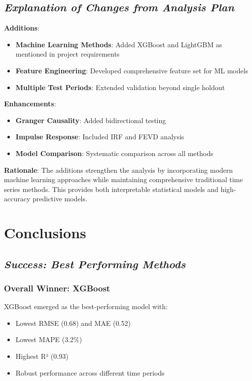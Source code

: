 \documentclass[12pt]{article}
\begin{document}
\subsection*{\textit{Explanation of Changes from Analysis Plan}}

\textbf{Additions}:
\begin{itemize}
    \item \textbf{Machine Learning Methods}: Added XGBoost and LightGBM as mentioned in project requirements
    \item \textbf{Feature Engineering}: Developed comprehensive feature set for ML models
    \item \textbf{Multiple Test Periods}: Extended validation beyond single holdout
\end{itemize}

\textbf{Enhancements}:
\begin{itemize}
    \item \textbf{Granger Causality}: Added bidirectional testing
    \item \textbf{Impulse Response}: Included IRF and FEVD analysis
    \item \textbf{Model Comparison}: Systematic comparison across all methods
\end{itemize}

\textbf{Rationale}:
The additions strengthen the analysis by incorporating modern machine learning approaches while maintaining comprehensive traditional time series methods. This provides both interpretable statistical models and high-accuracy predictive models.


\section*{\textbf{Conclusions}}

\subsection*{\textit{Success: Best Performing Methods}}

\subsubsection*{Overall Winner: XGBoost}

XGBoost emerged as the best-performing model with:
\begin{itemize}
    \item Lowest RMSE (0.68) and MAE (0.52)
    \item Lowest MAPE (3.2\%)
    \item Highest R² (0.93)
    \item Robust performance across different time periods
\end{itemize}
\end{document}
